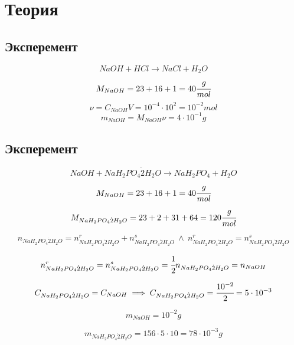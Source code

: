 \documentclass[a4paper]{article}
\numberwithin{equation}{section}
\begin{document}
\section{Теория}
\subsection{Эксперемент}
\begin{equation} 
    NaOH + HCl \to NaCl + H_2O 
\end{equation} 
\begin{equation*} 
    M_{NaOH} = 23 + 16 + 1 = 40 \cfrac{g}{mol}
\end{equation*} 
\begin{equation*} 
    \nu = C_{NaOH} V = 10^{ - 4} \cdot 10^2 = 10^{ - 2} mol
\end{equation*} 
\begin{equation} 
    m_{NaOH} = M_{NaOH} \nu = 4 \cdot 10^{ - 1} g
\end{equation}  

\subsection{Эксперемент}
\begin{equation} 
    NaOH + NaH_2PO_4 \dot 2 H_2 O \to NaH_2PO_4 + H_2 O
\end{equation} 
\begin{equation*} 
    M_{NaOH} = 23 + 16 + 1 = 40 \cfrac{g}{mol}
\end{equation*} 
\begin{equation*} 
    M_{NaH_2PO_4 \dot 2 H_2 O} = 23 + 2 +  31 + 64 = 120 \cfrac{g}{mol}
\end{equation*}

\begin{equation*} 
    n_{NaH_2PO_4 \dot 2 H_2 O} = n^{r}_{NaH_2PO_4 \dot 2 H_2 O} 
    + n^{s}_{NaH_2PO_4 \dot 2 H_2 O} 
    \ \land \      
    n^{r}_{NaH_2PO_4 \dot 2 H_2 O} = n^{s}_{NaH_2PO_4 \dot 2 H_2 O} 
\end{equation*} 

\begin{equation*}    
    n^{r}_{NaH_2PO_4 \dot 2 H_2 O} = n^{s}_{NaH_2PO_4 \dot 2 H_2 O} =
    \cfrac{1}{2} n_{NaH_2PO_4 \dot 2 H_2 O} = n_{NaOH}
\end{equation*} 

\begin{equation} 
  C_{NaH_2PO_4 \dot 2 H_2 O} = C_{NaOH} \implies 
  C_{NaH_2PO_4 \dot 2 H_2 O} = \cfrac{10^{ - 2} }{2} = 
  5 \cdot 10^{ - 3}  
\end{equation} 

\begin{equation} 
 m_{NaOH} = 10^{ - 2} g 
\end{equation} 
 
\begin{equation} 
 m_{NaH_2PO_4 \dot 2 H_2 O} = 156 \cdot 5 \cdot 10 = 
 78 \cdot 10^{ - 3} g  
\end{equation} 
\end{document}
